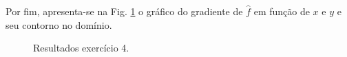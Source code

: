 Por fim, apresenta-se na Fig. \ref{fig:grad4} o gr\'afico do gradiente de $\hat f$ em fun\c{c}\~ao de $x$ e $y$ e seu contorno no domínio.
\begin{figure}[H]
    \centering
    \hfill
    \caption{Resultados exerc\'icio 4.}
    \label{fig:grad4}
\end{figure}